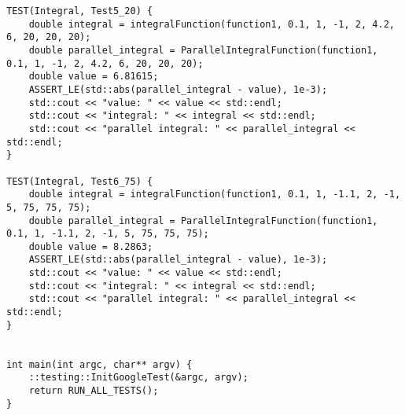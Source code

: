 \documentclass{report}
\begin{document}
\begin{lstlisting}
TEST(Integral, Test5_20) {
    double integral = integralFunction(function1, 0.1, 1, -1, 2, 4.2, 6, 20, 20, 20);
    double parallel_integral = ParallelIntegralFunction(function1, 0.1, 1, -1, 2, 4.2, 6, 20, 20, 20);
    double value = 6.81615;
    ASSERT_LE(std::abs(parallel_integral - value), 1e-3);
    std::cout << "value: " << value << std::endl;
    std::cout << "integral: " << integral << std::endl;
    std::cout << "parallel integral: " << parallel_integral << std::endl;
}

TEST(Integral, Test6_75) {
    double integral = integralFunction(function1, 0.1, 1, -1.1, 2, -1, 5, 75, 75, 75);
    double parallel_integral = ParallelIntegralFunction(function1, 0.1, 1, -1.1, 2, -1, 5, 75, 75, 75);
    double value = 8.2863;
    ASSERT_LE(std::abs(parallel_integral - value), 1e-3);
    std::cout << "value: " << value << std::endl;
    std::cout << "integral: " << integral << std::endl;
    std::cout << "parallel integral: " << parallel_integral << std::endl;
}


int main(int argc, char** argv) {
    ::testing::InitGoogleTest(&argc, argv);
    return RUN_ALL_TESTS();
}
\end{lstlisting}
\end{document}
